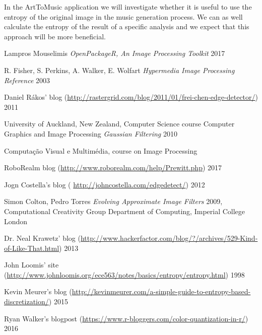 \documentclass[12pt]{article}
\begin{document}
In the ArtToMusic application we will investigate whether it is useful to use the entropy of the original image in the music generation process. We can as well calculate the entropy of the result of a specific analysis and we expect that this approach will be more beneficial.
  
\begin{thebibliography}{1}

 Lampros Mouselimis {\em OpenPackageR, An Image Processing Toolkit} 2017

 R. Fisher, S. Perkins, A. Walker, E. Wolfart {\em Hypermedia Image Processing Reference} 2003

 Daniel R\'akos' blog (\url{http://rastergrid.com/blog/2011/01/frei-chen-edge-detector/}) 2011

 University of Auckland, New Zealand, Computer Science course Computer Graphics and Image Processing {\em Gaussian Filtering} 2010

 Computaç\~ao Visual e Multimédia, course on Image Processing

 RoboRealm blog (\url{http://www.roborealm.com/help/Prewitt.php}) 2017

 Jogn Costella's blog ( \url{http://johncostella.com/edgedetect/}) 2012

 Simon Colton, Pedro Torres {\em Evolving Approximate Image Filters} 2009, Computational Creativity Group
Department of Computing, Imperial College London

 Dr. Neal Krawetz' blog (\url{http://www.hackerfactor.com/blog/?/archives/529-Kind-of-Like-That.html}) 2013

 John Loomis' site (\url{http://www.johnloomis.org/ece563/notes/basics/entropy/entropy.html}) 1998

 Kevin Meurer's blog (\url{http://kevinmeurer.com/a-simple-guide-to-entropy-based-discretization/}) 2015

 Ryan Walker's blogpost (\url{https://www.r-bloggers.com/color-quantization-in-r/}) 2016

\end{thebibliography}
\end{document}

